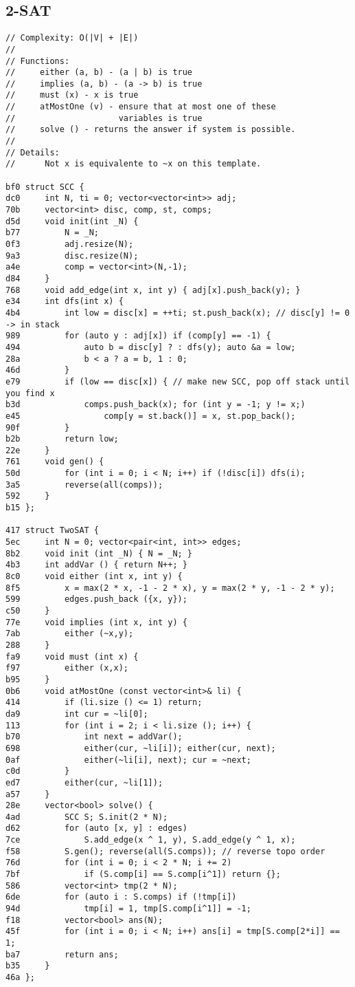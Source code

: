 \documentclass[11pt, a4paper, twoside]{article}
\begin{document}
\subsection{2-SAT}
\begin{lstlisting}
// Complexity: O(|V| + |E|)
// 
// Functions:
//     either (a, b) - (a | b) is true
//     implies (a, b) - (a -> b) is true
//     must (x) - x is true
//     atMostOne (v) - ensure that at most one of these
//                     variables is true
//     solve () - returns the answer if system is possible.
// 
// Details:
//      Not x is equivalente to ~x on this template.

bf0 struct SCC {
dc0     int N, ti = 0; vector<vector<int>> adj;
70b     vector<int> disc, comp, st, comps;
d5d     void init(int _N) { 
b77         N = _N; 
0f3         adj.resize(N);
9a3         disc.resize(N);
a4e         comp = vector<int>(N,-1); 
d84     }
768     void add_edge(int x, int y) { adj[x].push_back(y); }
e34     int dfs(int x) {
4b4         int low = disc[x] = ++ti; st.push_back(x); // disc[y] != 0 -> in stack
989         for (auto y : adj[x]) if (comp[y] == -1) {
494             auto b = disc[y] ? : dfs(y); auto &a = low;
28a             b < a ? a = b, 1 : 0;
46d         } 
e79         if (low == disc[x]) { // make new SCC, pop off stack until you find x
b3d             comps.push_back(x); for (int y = -1; y != x;) 
e45                 comp[y = st.back()] = x, st.pop_back();
90f         }
b2b         return low;
22e     }
761     void gen() {
50d         for (int i = 0; i < N; i++) if (!disc[i]) dfs(i);
3a5         reverse(all(comps));
592     }
b15 };
 
417 struct TwoSAT {
5ec     int N = 0; vector<pair<int, int>> edges;
8b2     void init (int _N) { N = _N; }
4b3     int addVar () { return N++; }
8c0     void either (int x, int y) { 
8f5         x = max(2 * x, -1 - 2 * x), y = max(2 * y, -1 - 2 * y);
599         edges.push_back ({x, y}); 
c50     }
77e     void implies (int x, int y) { 
7ab         either (~x,y); 
288     }
fa9     void must (int x) { 
f97         either (x,x); 
b95     }
0b6     void atMostOne (const vector<int>& li) {
414         if (li.size () <= 1) return;
da9         int cur = ~li[0];
113         for (int i = 2; i < li.size (); i++) {
b70             int next = addVar();
698             either(cur, ~li[i]); either(cur, next);
0af             either(~li[i], next); cur = ~next;
c0d         }
ed7         either(cur, ~li[1]);
a57     }
28e     vector<bool> solve() {
4ad         SCC S; S.init(2 * N);
d62         for (auto [x, y] : edges) 
7ce             S.add_edge(x ^ 1, y), S.add_edge(y ^ 1, x);
f58         S.gen(); reverse(all(S.comps)); // reverse topo order
76d         for (int i = 0; i < 2 * N; i += 2) 
7bf             if (S.comp[i] == S.comp[i^1]) return {};
586         vector<int> tmp(2 * N); 
6de         for (auto i : S.comps) if (!tmp[i]) 
94d             tmp[i] = 1, tmp[S.comp[i^1]] = -1;
f18         vector<bool> ans(N); 
45f         for (int i = 0; i < N; i++) ans[i] = tmp[S.comp[2*i]] == 1;
ba7         return ans;
b35     }
46a };
\end{lstlisting}
\end{document}
